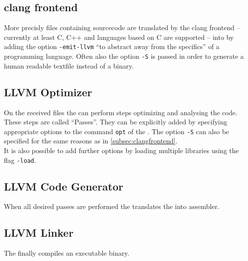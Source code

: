 \subsection{clang frontend}\label{subsec:clangfrontend}
More precisly files containing sourcecode are translated by the clang frontend -- currently at least C, C++ and languages based on C are supported -- into \llvmir by adding the option \texttt{-emit-llvm} \enquote{to abstract away from the specifics} \cite{FastScopDetection} of a programming language.
Often also the option \texttt{-S} is passed in order to generate a human readable textfile instead of a \llvmir binary.
\subsection{LLVM Optimizer}\label{subsec:optimizer}
On the received files the \opt can perform steps optimizing and analysing the code.
These steps are called \enquote{Passes}.
They can be explicitly added by specifying appropriate options to the command \texttt{opt} of the \opt.
The option \texttt{-S} can also be specified for the same reasons as in \autoref{subsec:clangfrontend}.\\
It is also possible to add further options by loading multiple libraries using the flag \texttt{-load}.
\subsection{LLVM Code Generator}
When all desired passes are performed the \generator translates the \llvmir into assembler.
\subsection{LLVM Linker}
The \linker finally compiles an executable binary.
